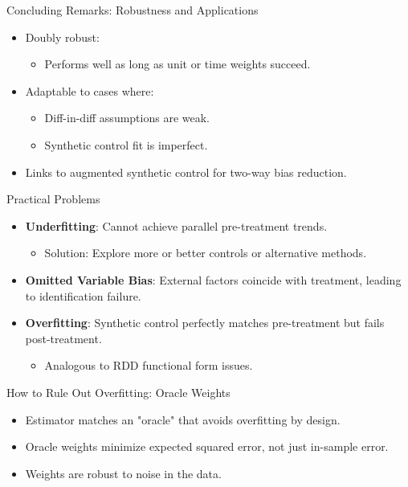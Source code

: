 \documentclass{beamer}
\begin{document}
\begin{frame}{Concluding Remarks: Robustness and Applications}

\begin{itemize}
    \item Doubly robust:
    \begin{itemize}
        \item Performs well as long as unit or time weights succeed.
    \end{itemize}
    \item Adaptable to cases where:
    \begin{itemize}
        \item Diff-in-diff assumptions are weak.
        \item Synthetic control fit is imperfect.
    \end{itemize}
    \item Links to augmented synthetic control for two-way bias reduction.
\end{itemize}

\end{frame}




\begin{frame}{Practical Problems}
\begin{itemize}
\item \textbf{Underfitting}: Cannot achieve parallel pre-treatment trends.
    \begin{itemize}
    \item Solution: Explore more or better controls or alternative methods.
    \end{itemize}
\item \textbf{Omitted Variable Bias}: External factors coincide with treatment, leading to identification failure.
\item \textbf{Overfitting}: Synthetic control perfectly matches pre-treatment but fails post-treatment.
    \begin{itemize}
    \item Analogous to RDD functional form issues.
    \end{itemize}
\end{itemize}
\end{frame}

\begin{frame}{How to Rule Out Overfitting: Oracle Weights}
\begin{itemize}
\item Estimator matches an "oracle" that avoids overfitting by design.
\item Oracle weights minimize expected squared error, not just in-sample error.
\item Weights are robust to noise in the data.
\end{itemize}
\end{frame}
\end{document}
